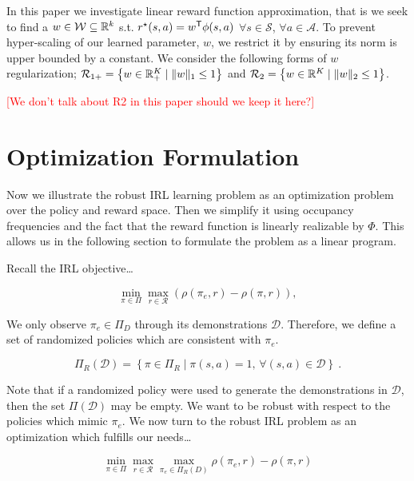 \documentclass[11pt]{article}
\newcommand{\gersi}[1]{\textcolor{red}{[#1]}}
\begin{document}
In this paper we investigate linear reward function approximation, that is we seek to find a $w \in \mathcal{W} \subseteq \mathbb{R}^k$ s.t. $r^{\mathnormal{\star}}(s,a) = w^{\mathsf{T}}
	\phi(s,a)$ $\forall s \in \mathcal{S}$, $\forall a \in \mathcal{A}$. To
prevent hyper-scaling of our learned parameter, $w$, we restrict it by
ensuring its norm is upper bounded by a constant. We consider the following
forms of $w$ regularization; $\mathcal{R}_{1+} = \left\{ w \in \mathbb{R}^K_+
	\mid \| w \|_1 \le 1 \right\}$ and $\mathcal{R}_2 = \left\{ w\in \mathbb{R}^K
	\mid  \|w \|_2 \le 1 \right\}$.

\gersi{We don't talk about R2 in this paper should we keep it here?}

\section{Optimization Formulation}\label{sec:optimization-formulation}
Now we illustrate the robust IRL learning problem as an optimization problem over the policy and reward space. Then we simplify it using occupancy frequencies
and the fact that the reward function is linearly realizable by $\Phi$. This allows us in the following section to formulate the problem as a linear program.

Recall the IRL objective\dots

\begin{equation}
	\min_{\pi \in \Pi} \max_{r \in \mathcal{R}} (\rho(\pi_e, r) - \rho(\pi, r)),
\end{equation}

We only observe $\pi_e \in \Pi_D$ through its demonstrations $\mathcal{D}$. Therefore, we define a set of randomized policies which are consistent with $\pi_e$.

\begin{equation} \label{eq:consistent-policies}
	\Pi_R(\mathcal{D}) = \left\{ \pi \in \Pi_R \mid \pi(s,a) = 1, \, \forall (s,a) \in \mathcal{D} \right\}~.
\end{equation}

Note that if a randomized policy were used to generate the demonstrations in
$\mathcal{D}$, then the set $\Pi(\mathcal{D})$ may be empty. We want to be robust with respect to the policies which mimic $\pi_e$.
We now turn to the robust IRL problem as an optimization which fulfills our needs\dots

\begin{equation}
	\label{eq:robust_IRL_formulation}
	\min_{\pi \in \Pi} \max_{r \in \mathcal{R}} \max_{\pi_e \in \Pi_{R}(D)} \rho(\pi_e, r) - \rho(\pi, r)
\end{equation}
\end{document}
